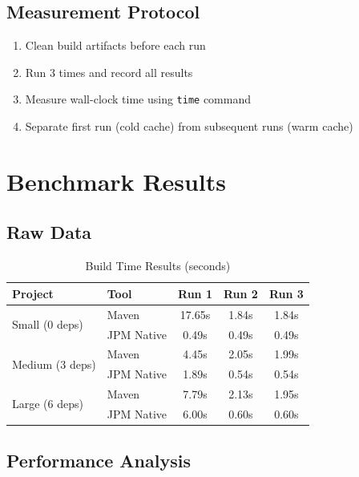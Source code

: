 \documentclass[12pt,a4paper]{report}
\begin{document}
\subsection{Measurement Protocol}

\begin{enumerate}
    \item Clean build artifacts before each run
    \item Run 3 times and record all results
    \item Measure wall-clock time using \texttt{time} command
    \item Separate first run (cold cache) from subsequent runs (warm cache)
\end{enumerate}

\section{Benchmark Results}

\subsection{Raw Data}

\begin{table}[H]
\centering
\begin{tabular}{llccc}
\toprule
\textbf{Project} & \textbf{Tool} & \textbf{Run 1} & \textbf{Run 2} & \textbf{Run 3} \\
\midrule
\multirow{2}{*}{Small (0 deps)} 
    & Maven & 17.65s & 1.84s & 1.84s \\
    & JPM Native & 0.49s & 0.49s & 0.49s \\
\midrule
\multirow{2}{*}{Medium (3 deps)} 
    & Maven & 4.45s & 2.05s & 1.99s \\
    & JPM Native & 1.89s & 0.54s & 0.54s \\
\midrule
\multirow{2}{*}{Large (6 deps)} 
    & Maven & 7.79s & 2.13s & 1.95s \\
    & JPM Native & 6.00s & 0.60s & 0.60s \\
\bottomrule
\end{tabular}
\caption{Build Time Results (seconds)}
\end{table}

\subsection{Performance Analysis}
\end{document}
